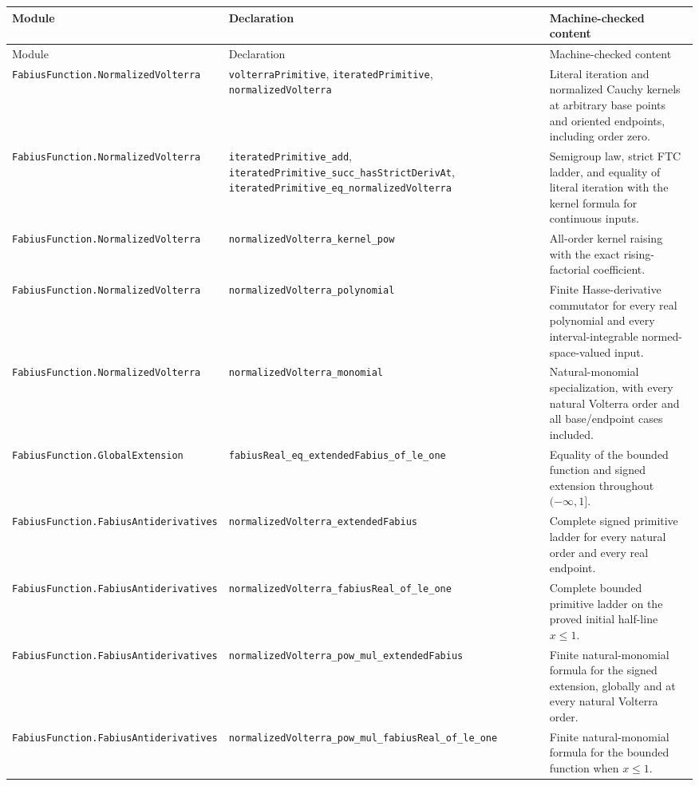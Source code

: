 \documentclass[11pt,oneside]{article}
\numberwithin{equation}{section}
\theoremstyle{definition}
\theoremstyle{remark}
\newcommand{\decl}[1]{\nolinkurl{#1}}
\begin{document}
\begingroup
\footnotesize
\begin{longtable}{@{}>{\raggedright\arraybackslash}p{}>{\raggedright\arraybackslash}p{}>{\raggedright\arraybackslash}p{}@{}}
\toprule
Module & Declaration & Machine-checked content \\
\midrule
\endfirsthead
\toprule
Module & Declaration & Machine-checked content \\
\midrule
\endhead
\decl{FabiusFunction.NormalizedVolterra} &
\decl{volterraPrimitive}, \decl{iteratedPrimitive},
\decl{normalizedVolterra} &
Literal iteration and normalized Cauchy kernels at arbitrary base points and
oriented endpoints, including order zero. \\
\decl{FabiusFunction.NormalizedVolterra} &
\decl{iteratedPrimitive_add},
\decl{iteratedPrimitive_succ_hasStrictDerivAt},
\decl{iteratedPrimitive_eq_normalizedVolterra} &
Semigroup law, strict FTC ladder, and equality of literal iteration with the
kernel formula for continuous inputs. \\
\decl{FabiusFunction.NormalizedVolterra} &
\decl{normalizedVolterra_kernel_pow} &
All-order kernel raising with the exact rising-factorial coefficient. \\
\decl{FabiusFunction.NormalizedVolterra} &
\decl{normalizedVolterra_polynomial} &
Finite Hasse-derivative commutator for every real polynomial and every
interval-integrable normed-space-valued input. \\
\decl{FabiusFunction.NormalizedVolterra} &
\decl{normalizedVolterra_monomial} &
Natural-monomial specialization, with every natural Volterra order and all
base/endpoint cases included. \\
\decl{FabiusFunction.GlobalExtension} &
\decl{fabiusReal_eq_extendedFabius_of_le_one} &
Equality of the bounded function and signed extension throughout
$(-\infty,1]$. \\
\decl{FabiusFunction.FabiusAntiderivatives} &
\decl{normalizedVolterra_extendedFabius} &
Complete signed primitive ladder for every natural order and every real
endpoint. \\
\decl{FabiusFunction.FabiusAntiderivatives} &
\decl{normalizedVolterra_fabiusReal_of_le_one} &
Complete bounded primitive ladder on the proved initial half-line $x\le1$. \\
\decl{FabiusFunction.FabiusAntiderivatives} &
\decl{normalizedVolterra_pow_mul_extendedFabius} &
Finite natural-monomial formula for the signed extension, globally and at
every natural Volterra order. \\
\decl{FabiusFunction.FabiusAntiderivatives} &
\decl{normalizedVolterra_pow_mul_fabiusReal_of_le_one} &
Finite natural-monomial formula for the bounded function when $x\le1$. \\
\bottomrule
\end{longtable}
\endgroup
\end{document}
